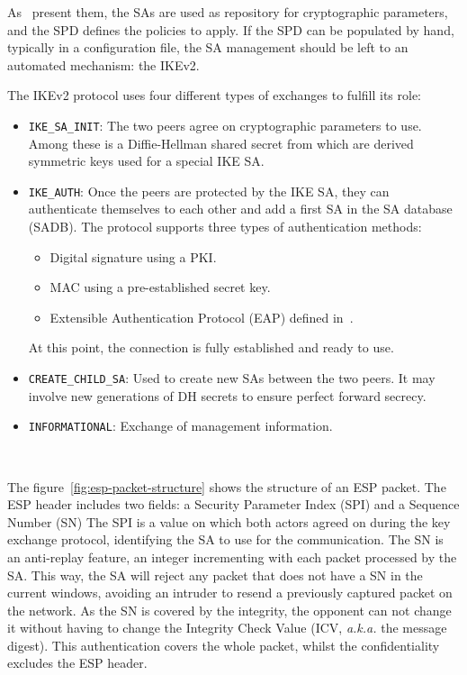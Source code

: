 As~\citet{Paterson200672} present them, the SAs are used as repository for cryptographic parameters, and the SPD defines the policies to apply.
If the SPD can be populated by hand, typically in a configuration file, the SA management should be left to an automated mechanism: the IKEv2.

\noindent The IKEv2 protocol uses four different types of exchanges to fulfill its role:
\begin{itemize}
	\item \texttt{IKE\_SA\_INIT}: The two peers agree on cryptographic parameters to use. Among these is a Diffie-Hellman shared secret from which are derived symmetric keys used for a special IKE SA.
	\item \texttt{IKE\_AUTH}: Once the peers are protected by the IKE SA, they can authenticate themselves to each other and add a first SA in the SA database (SADB).
	The protocol supports three types of authentication methods:
	\begin{itemize}
		\item Digital signature using a PKI.
		\item MAC using a pre-established secret key.
		\item Extensible Authentication Protocol (EAP) defined in~\citet{rfc3748}.
	\end{itemize}
	At this point, the connection is fully established and ready to use.
	\item \texttt{CREATE\_CHILD\_SA}: Used to create new SAs between the two peers. It may involve new generations of DH secrets to ensure perfect forward secrecy.
	\item \texttt{INFORMATIONAL}: Exchange of management information.
\end{itemize}
~\newline{}

The figure~\ref{fig:esp-packet-structure} shows the structure of an ESP packet.
The ESP header includes two fields: a Security Parameter Index (SPI) and a Sequence Number (SN)
The SPI is a value on which both actors agreed on during the key exchange protocol, identifying the SA to use for the communication.
The SN is an anti-replay feature, an integer incrementing with each packet processed by the SA. This way, the SA will reject any packet that does not have a SN in the current windows, avoiding an intruder to resend a previously captured packet on the network.
As the SN is covered by the integrity, the opponent can not change it without having to change the Integrity Check Value (ICV, \textit{a.k.a.} the message digest).
This authentication covers the whole packet, whilst the confidentiality excludes the ESP header.

